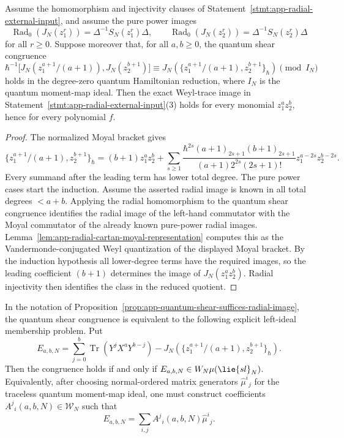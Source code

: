 \begin{prop}\label{prop:app-quantum-shear-suffices-radial-image}
  Assume the homomorphism and injectivity clauses of
  Statement~\ref{stmt:app-radial-external-input}, and assume the pure
  power images
  \[
    \operatorname{Rad}_0(J_N(z_1^r))=\Delta^{-1}S_N(z_1^r)\Delta,
    \qquad
    \operatorname{Rad}_0(J_N(z_2^r))=\Delta^{-1}S_N(z_2^r)\Delta
  \]
  for all \(r\geq0\).  Suppose moreover that, for all \(a,b\geq0\), the
  quantum shear congruence
  \[
    \hbar^{-1}\bigl[
      J_N(z_1^{a+1}/(a+1)),J_N(z_2^{b+1})
    \bigr]
    \equiv
    J_N\!\left(
      \{z_1^{a+1}/(a+1),z_2^{b+1}\}_\hbar
    \right)
    \pmod {I_N}
  \]
  holds in the degree-zero quantum Hamiltonian reduction, where \(I_N\)
  is the quantum moment-map ideal.  Then the exact Weyl-trace image in
  Statement~\ref{stmt:app-radial-external-input}(3) holds for every
  monomial \(z_1^az_2^b\), hence for every polynomial \(f\).
\end{prop}

\begin{proof}
  The normalized Moyal bracket gives
  \[
    \{z_1^{a+1}/(a+1),z_2^{b+1}\}_\hbar
    =
    (b+1)z_1^az_2^b
    +\sum_{s\ge1}
      \frac{\hbar^{2s}(a+1)_{2s+1}(b+1)_{2s+1}}
      {(a+1)2^{2s}(2s+1)!}
      z_1^{a-2s}z_2^{b-2s}.
  \]
  Every summand after the leading term has lower total degree.  The pure
  power cases start the induction.  Assume the asserted radial image is
  known in all total degrees \(<a+b\).  Applying the radial homomorphism
  to the quantum shear congruence identifies the radial image of the
  left-hand commutator with the Moyal commutator of the already known
  pure-power radial images.  Lemma~\ref{lem:app-radial-cartan-moyal-representation}
  computes this as the Vandermonde-conjugated Weyl quantization of the
  displayed Moyal bracket.  By the induction hypothesis all lower-degree
  terms have the required images, so the leading coefficient
  \((b+1)\) determines the image of \(J_N(z_1^az_2^b)\).  Radial
  injectivity then identifies the class in the reduced quotient.
\end{proof}

\begin{lem}
\label{lem:app-quantum-shear-primitive-obstruction}
  In the notation of
  Proposition~\ref{prop:app-quantum-shear-suffices-radial-image}, the
  quantum shear congruence is equivalent to the following explicit
  left-ideal membership problem.  Put
  \[
    E_{a,b,N}
    =
    \sum_{j=0}^b\operatorname{Tr}(Y^jX^aY^{b-j})
    -
    J_N\!\left(
      \{z_1^{a+1}/(a+1),z_2^{b+1}\}_\hbar
    \right).
  \]
  Then the congruence holds if and only if
  \(E_{a,b,N}\in\mathcal W_N\widehat\mu(\lie{sl}_N)\).  Equivalently,
  after choosing normal-ordered matrix generators
  \(\widehat\mu^i{}_j\) for the traceless quantum moment-map ideal, one
  must construct coefficients \(A^j{}_i(a,b,N)\in\mathcal W_N\) such
  that
  \[
    E_{a,b,N}=\sum_{i,j}A^j{}_i(a,b,N)\widehat\mu^i{}_j .
  \]
\end{lem}

